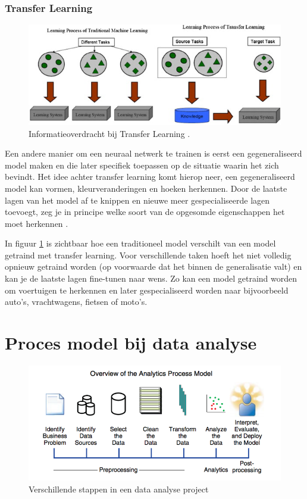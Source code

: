 \subsubsection{Transfer Learning}
\label{subsubsec:transfer-learning}

\begin{figure}
    \includegraphics[width=\linewidth]{img/transfer-learning.jpg}
    \caption{Informatieoverdracht bij Transfer Learning \autocite{Pan2009}.}
    \label{fig:transfer-learning}
\end{figure}

Een andere manier om een neuraal netwerk te trainen is eerst een gegeneraliseerd model maken en die later specifiek toepassen op de situatie waarin het zich bevindt. Het idee achter transfer learning komt hierop neer, een gegeneraliseerd model kan vormen, kleurveranderingen en hoeken herkennen. Door de laatste lagen van het model af te knippen en nieuwe meer gespecialiseerde lagen toevoegt, zeg je in principe welke soort van de opgesomde eigenschappen het moet herkennen \autocite{Khandelwal2019}. 

In figuur \ref{fig:transfer-learning} is zichtbaar hoe een traditioneel model verschilt van een model getraind met transfer learning. Voor verschillende taken hoeft het niet volledig opnieuw getraind worden (op voorwaarde dat het binnen de generalisatie valt) en kan je de laatste lagen fine-tunen naar wens. Zo kan een model getraind worden om voertuigen te herkennen en later gespecialiseerd worden naar bijvoorbeeld auto's, vrachtwagens, fietsen of moto's.

\section{Proces model bij data analyse}
\label{sec:proces-model}

\begin{figure}
    \includegraphics[width=\linewidth]{img/proces-model.png}
    \caption{Verschillende stappen in een data analyse project \autocite{Lemahieu2018}}
    \label{fig:proces-model.png}
\end{figure}

